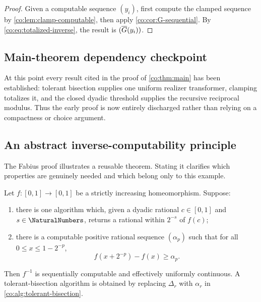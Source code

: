 \begin{proof}
Given a computable sequence $(y_i)$, first compute the clamped sequence by
\cref{co:lem:clamp-computable}, then apply \cref{co:cor:G-sequential}.  By
\eqref{co:eq:totalized-inverse}, the result is $(\overline G(y_i))$.
\end{proof}

\subsection{Main-theorem dependency checkpoint}

At this point every result cited in the proof of \cref{co:thm:main} has been
established: tolerant bisection supplies one uniform realizer transformer,
clamping totalizes it, and the closed dyadic threshold supplies the recursive
reciprocal modulus.  Thus the early proof is now entirely discharged rather
than relying on a compactness or choice argument.

\subsection{An abstract inverse-computability principle}

The Fabius proof illustrates a reusable theorem.  Stating it clarifies which
properties are genuinely needed and which belong only to this example.

\begin{theorem}
\label{co:thm:abstract-inversion}
Let $f:[0,1]\to[0,1]$ be a strictly increasing homeomorphism.  Suppose:
\begin{enumerate}
\item there is one algorithm which, given a dyadic rational $c\in[0,1]$ and
      $s\in\NaturalNumbers$, returns a rational within $2^{-s}$ of $f(c)$;
\item there is a computable positive rational sequence $(\alpha_p)$ such that
      for all $0\le x\le1-2^{-p}$,
      \begin{equation}\label{co:eq:abstract-gap}
       f(x+2^{-p})-f(x)\ge\alpha_p.
      \end{equation}
\end{enumerate}
Then $f^{-1}$ is sequentially computable and effectively uniformly continuous.
A tolerant-bisection algorithm is obtained by replacing $\Delta_r$ with
$\alpha_r$ in \cref{co:alg:tolerant-bisection}.
\end{theorem}


